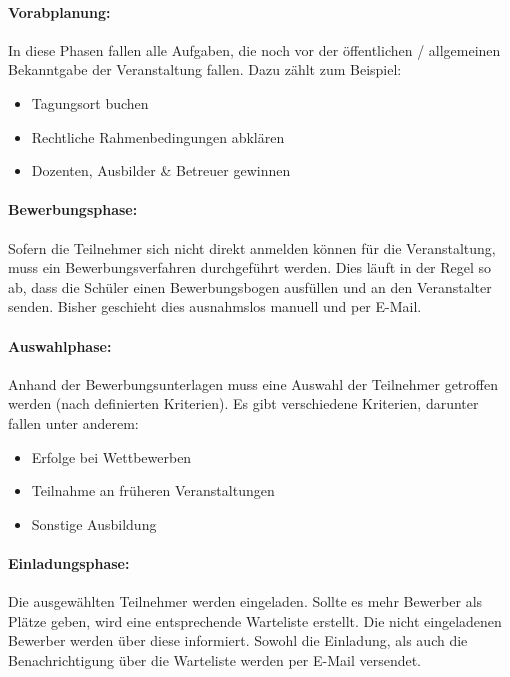 \documentclass[a4paper]{scrartcl}
\begin{document}
	\paragraph{Vorabplanung:}
	In diese Phasen fallen alle Aufgaben, die noch vor der öffentlichen / allgemeinen Bekanntgabe der Veranstaltung fallen. Dazu zählt zum Beispiel:
	
	\begin{itemize}
		\item Tagungsort buchen
		\item Rechtliche Rahmenbedingungen abklären
		\item Dozenten, Ausbilder \& Betreuer gewinnen
	\end{itemize}
	
	\paragraph{Bewerbungsphase:}
	Sofern die Teilnehmer sich nicht direkt anmelden können für die Veranstaltung, muss ein Bewerbungsverfahren durchgeführt werden. Dies läuft in der Regel so ab, dass die Schüler einen Bewerbungsbogen ausfüllen und an den Veranstalter senden. Bisher geschieht dies ausnahmslos manuell und per E-Mail.
	
	\paragraph{Auswahlphase:}
	Anhand der Bewerbungsunterlagen muss eine Auswahl der Teilnehmer getroffen werden (nach definierten Kriterien). Es gibt verschiedene Kriterien, darunter fallen unter anderem:
	
	\begin{itemize}
		\item Erfolge bei Wettbewerben
		\item Teilnahme an früheren Veranstaltungen
		\item Sonstige Ausbildung
	\end{itemize}
	
	\paragraph{Einladungsphase:}
	Die ausgewählten Teilnehmer werden eingeladen. Sollte es mehr Bewerber als Plätze geben, wird eine entsprechende Warteliste erstellt. Die nicht eingeladenen Bewerber werden über diese informiert. Sowohl die Einladung, als auch die Benachrichtigung über die Warteliste werden per E-Mail versendet.
	
\end{document}

